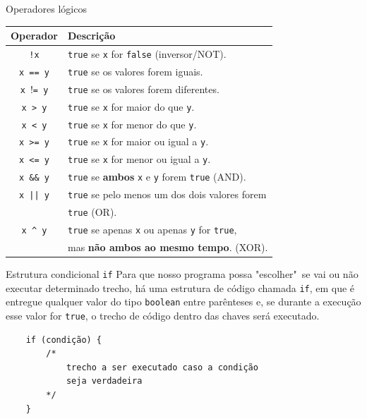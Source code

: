 \documentclass{beamer}
\begin{document}
\begin{frame}{Operadores lógicos}
    \begin{center}
        \begin{tabular}{|c|l|}
            \hline Operador & Descrição \\ \hline
            \texttt{!x} & \texttt{true} se \texttt{x} for \texttt{false} (inversor/NOT). \\
            \texttt{x == y} & \texttt{true} se os valores forem iguais. \\
            \texttt{x $!$= y} & \texttt{true} se os valores forem diferentes. \\
            \texttt{x > y} & \texttt{true} se \texttt{x} for maior do que \texttt{y}. \\
            \texttt{x < y} & \texttt{true} se \texttt{x} for menor do que \texttt{y}. \\
            \texttt{x >= y} & \texttt{true} se \texttt{x} for maior ou igual a \texttt{y}. \\
            \texttt{x <= y} & \texttt{true} se \texttt{x} for menor ou igual a \texttt{y}. \\
            \texttt{x \&\& y} & \texttt{true} se \textbf{ambos} \texttt{x} e \texttt{y} forem \texttt{true} (AND). \\
            \texttt{x || y} & \texttt{true} se pelo menos um dos dois valores forem \\
            & \texttt{true} (OR). \\
            \texttt{x \^{} y} & \texttt{true} se apenas \texttt{x} ou apenas \texttt{y} for \texttt{true}, \\
            & mas \textbf{não ambos ao mesmo tempo}. (XOR). \\
            \hline
        \end{tabular}
    \end{center}
\end{frame}

\begin{frame}[fragile]{Estrutura condicional \texttt{if}}
    Para que nosso programa possa "escolher"\ se vai ou não executar determinado
    trecho, há uma estrutura de código chamada \texttt{if}, em que é entregue
    qualquer valor do tipo \texttt{boolean} entre parênteses e, se durante a
    execução esse valor for \texttt{true}, o trecho de código dentro das chaves
    será executado.

    \begin{verbatim}
    if (condição) {
        /*
            trecho a ser executado caso a condição
            seja verdadeira
        */
    }
    \end{verbatim}
\end{frame}
\end{document}
